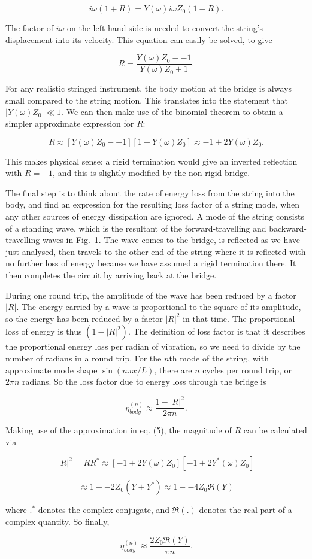   $$i \omega (1+R) = Y(\omega) i \omega Z_0 (1-R) .\tag{3}$$ 

  The factor of $i \omega$ on the left-hand side is needed to convert the 
  string's displacement into its velocity. This equation can easily be solved, 
  to give 

  $$R=\dfrac{Y(\omega) Z_0 -- 1}{Y(\omega) Z_0 + 1} .\tag{4}$$ 

  For any realistic stringed instrument, the body motion at the bridge is 
  always small compared to the string motion. This translates into the 
  statement that $|Y(\omega) Z_0| \ll 1$. We can then make use of the binomial 
  theorem to obtain a simpler approximate expression for $R$: 

  $$R \approx [Y(\omega) Z_0 -- 1][1-Y(\omega) Z_0] \approx -1 +2Y(\omega) Z_0 
  .\tag{5}$$ 

  This makes physical sense: a rigid termination would give an inverted 
  reflection with $R=-1$, and this is slightly modified by the non-rigid 
  bridge. 

  The final step is to think about the rate of energy loss from the string into 
  the body, and find an expression for the resulting loss factor of a string 
  mode, when any other sources of energy dissipation are ignored. A mode of the 
  string consists of a standing wave, which is the resultant of the 
  forward-travelling and backward-travelling waves in Fig.\ 1. The wave comes 
  to the bridge, is reflected as we have just analysed, then travels to the 
  other end of the string where it is reflected with no further loss of energy 
  because we have assumed a rigid termination there. It then completes the 
  circuit by arriving back at the bridge. 

  During one round trip, the amplitude of the wave has been reduced by a factor 
  $|R|$. The energy carried by a wave is proportional to the square of its 
  amplitude, so the energy has been reduced by a factor $|R|^2$ in that time. 
  The proportional loss of energy is thus $(1-|R|^2)$. The definition of loss 
  factor is that it describes the proportional energy loss per radian of 
  vibration, so we need to divide by the number of radians in a round trip. For 
  the $n$th mode of the string, with approximate mode shape $\sin (n \pi x/L)$, 
  there are $n$ cycles per round trip, or $2 \pi n$ radians. So the loss factor 
  due to energy loss through the bridge is 

  $$\eta^{(n)}_{body} \approx \dfrac{1-|R|^2}{2 \pi n} . \tag{6}$$ 

  Making use of the approximation in eq. (5), the magnitude of $R$ can be 
  calculated via 

  $$|R|^2=R R^* \approx [-1+2Y(\omega) Z_0] [-1+2Y^*(\omega) Z_0]$$ 

  $$\approx 1 -- 2 Z_0 (Y + Y^*) \approx 1 -- 4 Z_0 \Re(Y)\tag{7}$$ 

  where $.^*$ denotes the complex conjugate, and $\Re(.)$ denotes the real part 
  of a complex quantity. So finally, 

  $$\eta^{(n)}_{body} \approx \dfrac{2 Z_0 \Re(Y)}{ \pi n} . \tag{8}$$ 